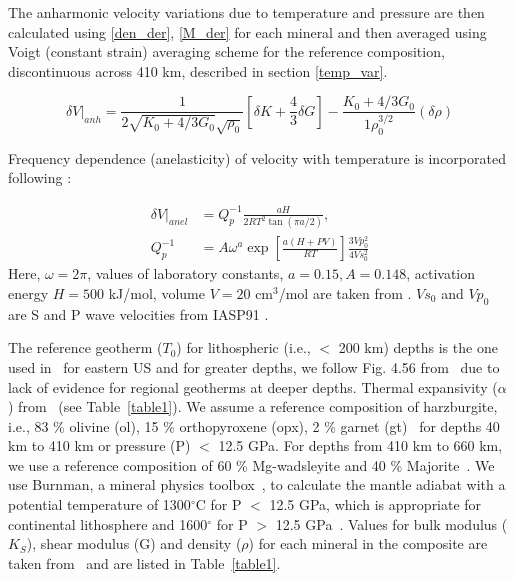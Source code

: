 \documentclass[draft,linenumbers]{agujournal2018}
\begin{document}
The anharmonic velocity variations due to temperature and pressure are then calculated using \ref{den_der}, \ref{M_der} for each mineral and then averaged using Voigt (constant strain) averaging scheme for the reference composition, discontinuous across 410 km,  described in section \ref{temp_var}.

\begin{equation} \label{anh}
    \delta V \vert_{anh} = \frac{1}{2\sqrt{K_0 + 4/3 G_0} \sqrt{\rho_0}} \left[\delta K + \frac{4}{3} \delta G \right] - \frac{K_0 + 4/3 G_0}{1\rho_0^{3/2}} ( \delta \rho)
\end{equation} 

Frequency dependence (anelasticity) of velocity with temperature is incorporated following \citet{Goes_2000}:

\begin{align} \label{anel}
    \delta V \vert_{anel} &= Q_p^{-1} \frac{aH}{2 R T^2 \tan(\pi a/2)},\\
    Q_p^{-1} &= A \omega^{a} \exp \left[ \frac{a(H+PV)}{RT} \right] \frac{3Vp_{0}^{2}}{4Vs_{0}^{2}} \nonumber
\end{align}
Here, $\omega = 2\pi $, values of laboratory constants, $a = 0.15, A = 0.148$, activation energy $H = 500$ kJ/mol, volume $V = 20$ cm$^3$/mol are taken from \citet{sobolev1996upper}. $Vs_0$ and $Vp_0$ are S and P wave velocities from IASP91 \citep{kennett1991traveltimes}.

The reference geotherm ($T_0$) for lithospheric (i.e., $<$ 200 km) depths is the one used in~\citep{Goes_2002} for eastern US and for greater depths, we follow Fig. 4.56 from~\citet{turcotte2014geodynamics} due to lack of evidence for regional geotherms at deeper depths. Thermal expansivity ($\alpha$) from~\citet{saxena_data} (see Table~\ref{table1}). We assume a reference composition of harzburgite, i.e., 83 \% olivine (ol), 15 \% orthopyroxene (opx), 2 \% garnet (gt)~\citep{mcdonough1998mineralogy} for depths 40 km to 410 km or pressure (P) $<$ 12.5 GPa. For depths from 410 km to 660 km, we use a reference composition of 60 \% Mg-wadsleyite and 40 \% Majorite~\citep{haggerty1995upper}. We use Burnman, a mineral physics toolbox~\citep{cottaar2014burnman}, to calculate the mantle adiabat with a potential temperature of 1300$^{\circ}$C for P $<$ 12.5 GPa, which is appropriate for continental lithosphere \citep{rudnick1998thermal} and 1600$^{\circ}$ for P $>$ 12.5 GPa~\citep{katsura2010adiabatic}. Values for bulk modulus ($K_S$), shear modulus (G) and density ($\rho$) for each mineral in the composite are taken from~\citet{Cammarano2003} and are listed in Table~\ref{table1}.
\end{document}
